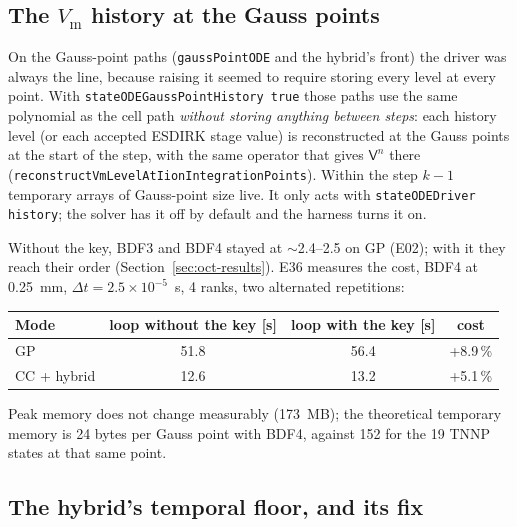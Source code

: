 \documentclass[11pt,a4paper]{article}
\newcommand{\code}[1]{\texttt{\small #1}}
\newcommand{\Vm}{V_{\text{m}}}
\newcommand{\dictkey}[1]{\textcolor{black!60!green}{\texttt{\footnotesize #1}}}
\begin{document}
\subsection{The \texorpdfstring{$\Vm$}{Vm} history at the Gauss points}
\label{sec:oct-gausshist}

On the Gauss-point paths (\code{gaussPointODE} and the hybrid's front) the driver
was always the line, because raising it seemed to require storing every level at
every point. With \dictkey{stateODEGaussPointHistory true} those paths use the same
polynomial as the cell path \emph{without storing anything between steps}: each
history level (or each accepted ESDIRK stage value) is reconstructed at the Gauss
points at the start of the step, with the same operator that gives
$\mathsf{V}^n$ there (\code{reconstructVmLevelAtIionIntegrationPoints}). Within the
step $k-1$ temporary arrays of Gauss-point size live. It only acts with
\code{stateODEDriver history}; the solver has it off by default and the harness
turns it on.

Without the key, BDF3 and BDF4 stayed at $\sim$2.4--2.5 on GP (E02); with it they
reach their order (Section~\ref{sec:oct-results}). E36 measures the cost, BDF4 at
0.25~mm, $\Delta t=2.5\times10^{-5}$~s, 4 ranks, two alternated repetitions:

\begin{center}
\begin{tabular}{@{}lccc@{}}
\toprule
Mode & loop without the key [s] & loop with the key [s] & cost \\
\midrule
GP           & 51.8 & 56.4 & +8.9\,\% \\
CC + hybrid  & 12.6 & 13.2 & +5.1\,\% \\
\bottomrule
\end{tabular}
\end{center}

Peak memory does not change measurably (173~MB); the theoretical temporary memory
is 24 bytes per Gauss point with BDF4, against 152 for the 19 TNNP states at that
same point.

\subsection{The hybrid's temporal floor, and its fix}
\label{sec:oct-hybrid}
\end{document}

